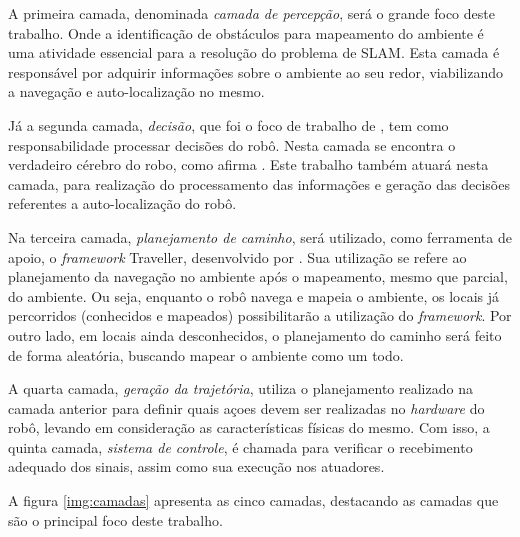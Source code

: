 		A primeira camada, denominada \textit{camada de percepção}, será o grande foco deste trabalho. Onde a identificação de obstáculos para mapeamento do ambiente é uma atividade essencial para a resolução do problema de SLAM. Esta camada é responsável por adquirir informações sobre o ambiente ao seu redor, viabilizando a navegação e auto-localização no mesmo.

		Já a segunda camada, \textit{decisão}, que foi o foco de trabalho de \cite{tccCarol}, tem como responsabilidade processar decisões do robô. Nesta camada se encontra o verdadeiro cérebro do robo, como afirma \cite{vieira}. Este trabalho também atuará nesta camada, para realização do processamento das informações e geração das decisões referentes a auto-localização do robô.

		Na terceira camada, \textit{planejamento de caminho}, será utilizado, como ferramenta de apoio, o \textit{framework} Traveller, desenvolvido por \cite{tccRodrigo}. Sua utilização se refere ao planejamento da navegação no ambiente após o mapeamento, mesmo que parcial, do ambiente. Ou seja, enquanto o robô navega e mapeia o ambiente, os locais já percorridos (conhecidos e mapeados) possibilitarão a utilização do \textit{framework}. Por outro lado, em locais ainda desconhecidos, o planejamento do caminho será feito de forma aleatória, buscando mapear o ambiente como um todo.

		A quarta camada, \textit{geração da trajetória}, utiliza o planejamento realizado na camada anterior para definir quais açoes devem ser realizadas no \textit{hardware} do robô, levando em consideração as características físicas do mesmo. Com isso, a quinta camada, \textit{sistema de controle}, é chamada para verificar o recebimento adequado dos sinais, assim como sua execução nos atuadores. 

		A figura \ref{img:camadas} apresenta as cinco camadas, destacando as camadas que são o principal foco deste trabalho.

